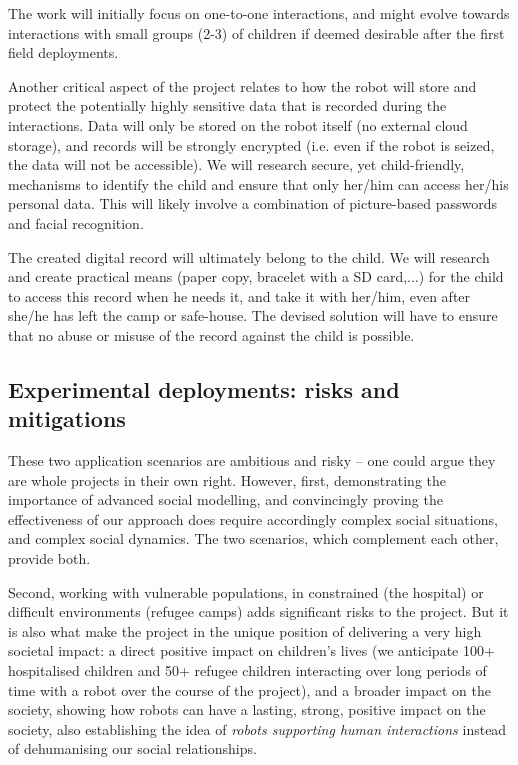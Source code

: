 \documentclass[11pt]{report}
\begin{document}
The work will initially focus on one-to-one interactions, and might evolve
towards interactions with small groups (2-3) of children if deemed desirable
after the first field deployments.

Another critical aspect of the project relates to how the robot will store and
protect the potentially highly sensitive data that is recorded during the
interactions. Data will only be stored on the robot itself (no external cloud
storage), and records will be strongly encrypted (i.e. even if the robot is
seized, the data will not be accessible). We will research secure, yet
child-friendly, mechanisms to identify the child and ensure that only her/him
can access her/his personal data. This will likely involve a combination of
picture-based passwords and facial recognition.

The created digital record will ultimately belong to the child. We will research
and create practical means (paper copy, bracelet with a SD card,...) for the
child to access this record when he needs it, and take it with her/him, even
after she/he has left the camp or safe-house. The devised solution will have to
ensure that no abuse or misuse of the record against the child is possible.

\subsection{Experimental deployments: risks and mitigations}

These two application scenarios are ambitious and risky -- one could argue they
are whole projects in their own right. However, first, demonstrating the
importance of advanced social modelling, and convincingly proving the
effectiveness of our approach does require accordingly complex social
situations, and complex social dynamics. The two scenarios, which complement
each other, provide both.

Second, working with vulnerable populations, in constrained (the hospital) or
difficult environments (refugee camps) adds significant risks to the project.
But it is also what make the project in the unique position of delivering a very
high societal impact: a direct positive impact on children's lives (we
anticipate 100+ hospitalised children and 50+ refugee children interacting over
long periods of time with a robot over the course of the project), and a broader
impact on the society, showing how robots can have a lasting, strong, positive
impact on the society, also establishing the idea of \emph{robots supporting
human interactions} instead of dehumanising our social relationships.
\end{document}
